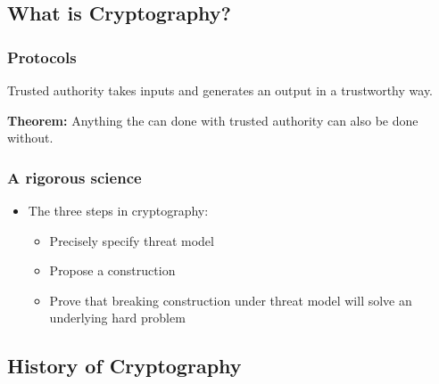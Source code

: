 \documentclass[12pt]{book}
\newcommand{\Thm}{\textbf{Theorem:} }
\begin{document}
\subsection{What is Cryptography?}
\subsubsection{Protocols}
Trusted authority takes inputs and generates an output in a trustworthy way.

\Thm Anything the can done with trusted authority can also be done without.

\subsubsection{A rigorous science}
\begin{itemize}
	\item The three steps in cryptography:
	\begin{itemize}
		\item Precisely specify threat model
		\item Propose a construction
		\item Prove that breaking construction under threat model will solve an underlying hard problem 
	\end{itemize}
\end{itemize}

\subsection{History of Cryptography}
\end{document}

